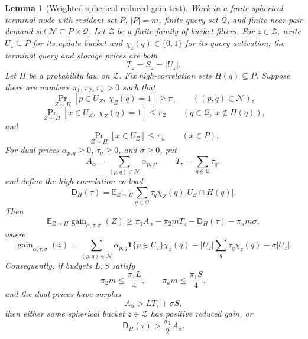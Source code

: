 \documentclass[10pt]{article}
\newtheorem{lemma}[theorem]{Lemma}
\theoremstyle{definition}
\newcommand{\E}{\mathbb{E}}
\begin{document}
\begin{lemma}[Weighted spherical reduced-gain test]
   \label{lem:weighted-spherical-reduced-gain}
   Work in a finite spherical terminal node with resident set \(P\), \(|P|=m\),
   finite query set \(\mathcal Q\), and finite near-pair demand set
   \(\mathcal N\subseteq P\times\mathcal Q\).  Let \(\mathcal Z\) be a finite
   family of bucket filters.  For \(z\in\mathcal Z\), write \(U_z\subseteq P\)
   for its update bucket and \(\chi_z(q)\in\{0,1\}\) for its query activation;
   the terminal query and storage prices are both
   \[
      T_z=S_z=|U_z|.
   \]
   Let \(\Pi\) be a probability law on \(\mathcal Z\).  Fix high-correlation
   sets \(H(q)\subseteq P\).  Suppose there are numbers
   \(\pi_1,\pi_2,\pi_u>0\) such that
   \[
      \Pr_{Z\sim\Pi}[p\in U_Z,\ \chi_Z(q)=1]\ge\pi_1
      \qquad((p,q)\in\mathcal N),
      \tag{WS1}
   \]
   \[
      \Pr_{Z\sim\Pi}[x\in U_Z,\ \chi_Z(q)=1]\le\pi_2
      \qquad(q\in\mathcal Q,\ x\notin H(q)),
      \tag{WS2}
   \]
   and
   \[
      \Pr_{Z\sim\Pi}[x\in U_Z]\le\pi_u
      \qquad(x\in P).
      \tag{WS3}
   \]
   For dual prices \(\alpha_{p,q}\ge0\), \(\tau_q\ge0\), and \(\sigma\ge0\), put
   \[
      A_\alpha=\sum_{(p,q)\in\mathcal N}\alpha_{p,q},
      \qquad
      T_\tau=\sum_{q\in\mathcal Q}\tau_q,
   \]
   and define the high-correlation co-load
   \[
      \mathsf D_H(\tau)
      =
      \E_{Z\sim\Pi}
      \sum_{q\in\mathcal Q}\tau_q\chi_Z(q)|U_Z\cap H(q)|.
      \tag{WS4}
   \]
   Then
   \[
   \E_{Z\sim\Pi}
   \operatorname{gain}_{\alpha,\tau,\sigma}(Z)
   \ge
   \pi_1A_\alpha-\pi_2mT_\tau-\mathsf D_H(\tau)-\pi_um\sigma,
   \tag{WS5}
   \]
   where
   \[
      \operatorname{gain}_{\alpha,\tau,\sigma}(z)
      =
      \sum_{(p,q)\in\mathcal N}\alpha_{p,q}\mathbf 1\{p\in U_z\}\chi_z(q)
      -
      |U_z|\sum_q\tau_q\chi_z(q)
      -
      \sigma |U_z|.
   \]
   Consequently, if budgets \(L,S\) satisfy
   \[
      \pi_2m\le\frac{\pi_1L}{4},
      \qquad
      \pi_um\le\frac{\pi_1S}{4},
      \tag{WS6}
   \]
   and the dual prices have surplus
   \[
      A_\alpha>L T_\tau+\sigma S,
      \tag{WS7}
   \]
   then either some spherical bucket \(z\in\mathcal Z\) has positive reduced
   gain, or
   \[
      \mathsf D_H(\tau)>\frac{\pi_1}{2}A_\alpha .
      \tag{WS8}
   \]
\end{lemma}
\end{document}
